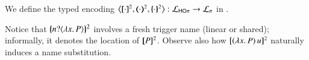 \smallskip 

\begin{definition}
\label{d:enc:hopitopi}
We define the typed encoding 
$\enco{\map{\cdot}^{2}, \mapt{\cdot}^{2}, \mapa{\cdot}^{2}}: \tyl{L}_{\HOp} \to \tyl{L}_{\sessp}$  
in . 
\end{definition}

\smallskip 
\noi 
Notice that $\{\!\!\{n ? \langle \lambda  x.\,P \rangle \}\!\!\}^2$ involves a fresh trigger name (linear or shared);
informally, it denotes the location of $[\!\![P]\!\!]^2$. 
Observe also how $[\!\![(\lambda x.\,P)\, {u}]\!\!]^2$ naturally induces a name substitution.
\smallskip 
